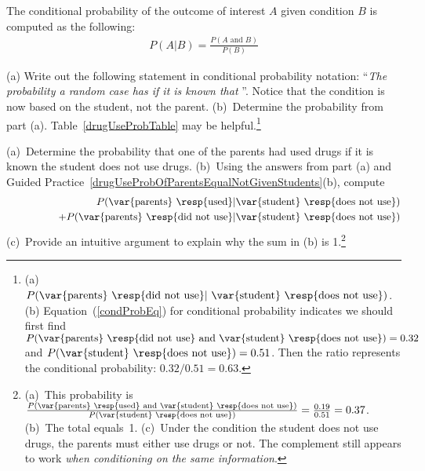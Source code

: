 \begin{termBox}{
The conditional probability of the outcome of interest $A$ given condition $B$ is computed as the following: \vspace{-1.5mm}
\begin{eqnarray}
P(A | B) = \frac{P(A\text{ and }B)}{P(B)}
\label{condProbEq}
\end{eqnarray}}
\end{termBox}

\begin{exercise}\label{drugUseProbOfParentsEqualNotGivenStudents}
(a) Write out the following statement in conditional probability notation: ``\emph{The probability a random case has   if it is known that  }''. Notice that the condition is now based on the {student}, not the {parent}. (b)~Determine the probability from part (a). Table~\vref{drugUseProbTable} may be helpful.\footnote{(a) $P(\text{\var{parents}  \resp{did not use}} | \text{ \var{student} \resp{does not use}})$. (b) Equation~(\ref{condProbEq}) for conditional probability indicates we should first find $P(\text{\var{parents} \resp{did not use} and \var{student} \resp{does not use}})=0.32$ and $P(\text{\var{student} \resp{does not use}})=0.51$. Then the ratio represents the conditional probability: $0.32/0.51 = 0.63$.}
\end{exercise}

\begin{exercise}\label{whyCondProbSumTo1}
(a)~Determine the probability that one of the parents had used drugs if it is known the student does not use drugs.
(b)~Using the answers from part (a) and Guided Practice~\ref{drugUseProbOfParentsEqualNotGivenStudents}(b), compute \vspace{-1.5mm}
\begin{eqnarray*}
&&P(\text{\var{parents} \resp{used}}|\text{\var{student} \resp{does not use}})\\
&&	\quad \quad \quad \quad + P(\text{\var{parents} \resp{did not use}}|\text{\var{student} \resp{does not use}})
\end{eqnarray*}
(c)~Provide an intuitive argument to explain why the sum in (b) is 1.\footnote{(a)~This probability is $\frac{P(\text{\var{parents} \resp{used} and \var{student} \resp{does not use}})}{P(\text{\var{student} \resp{does not use}})} = \frac{0.19}{0.51} = 0.37$. (b)~The total equals~1. (c)~Under the condition the student does not use drugs, the parents must either use drugs or not. The complement still appears to work \emph{when conditioning on the same information}.}
\end{exercise}

